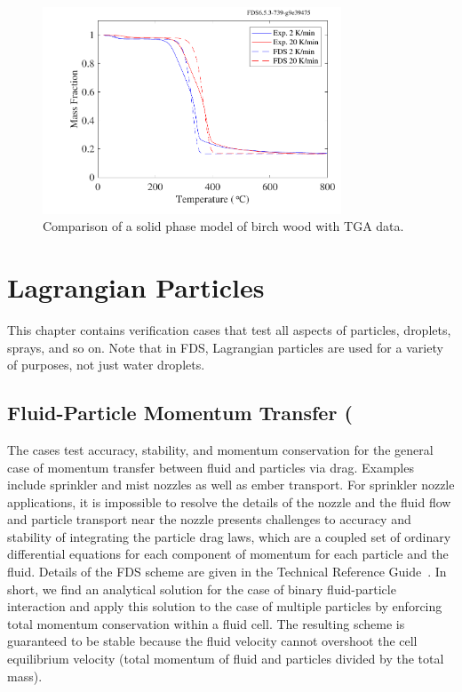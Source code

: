\documentclass[11pt]{book}
\begin{document}
\begin{figure}[ht]
   \begin{center}
      \includegraphics[width=3.5in]{SCRIPT_FIGURES/birch_tga}
      \caption[An example of TGA data]{\label{fig_birch_tga}
    Comparison of a solid phase model of birch wood with TGA data.}
   \end{center}
   \end{figure}





\chapter{Lagrangian Particles}

This chapter contains verification cases that test all aspects of particles, droplets, sprays, and so on. Note that in FDS, Lagrangian particles are used for a variety of purposes, not just water droplets.

\section{Fluid-Particle Momentum Transfer (\texorpdfstring{})}

The  cases test accuracy, stability, and momentum conservation for the general case of momentum transfer between fluid and particles via drag.  Examples include sprinkler and mist nozzles as well as ember transport.  For sprinkler nozzle applications, it is impossible to resolve the details of the nozzle and the fluid flow and particle transport near the nozzle presents challenges to accuracy and stability of integrating the particle drag laws, which are a coupled set of ordinary differential equations for each component of momentum for each particle and the fluid.  Details of the FDS scheme are given in the Technical Reference Guide~\cite{FDS_Tech_Guide}.  In short, we find an analytical solution for the case of binary fluid-particle interaction and apply this solution to the case of multiple particles by enforcing total momentum conservation within a fluid cell.  The resulting scheme is guaranteed to be stable because the fluid velocity cannot overshoot the cell equilibrium velocity (total momentum of fluid and particles divided by the total mass).
\end{document}
